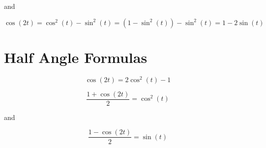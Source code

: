 \documentclass{ximera}
\begin{document}
and

\[   \cos(2t) =    \cos^2(t) - \sin^2(t)  =    (1 - \sin^2(t)) - \sin^2(t)  = 1 - 2 \sin(t)     \]




































\section{Half Angle Formulas}



\[   \cos(2t)  =  2 \cos^2(t) - 1 \]


\[   \frac{1 + \cos(2t)}{2}  =   \cos^2(t)  \]



and

\[  \frac{1 -  \cos(2t)}{2}  =  \sin(t)     \]
\end{document}

